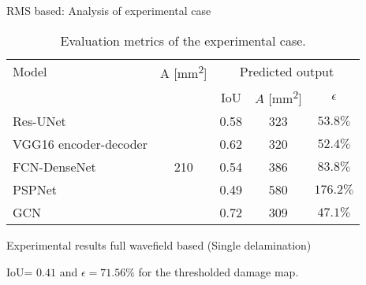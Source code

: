 \documentclass[10pt,aspectratio=169,dvipsnames]{beamer} %
\begin{document}
		\begin{frame}{RMS based: Analysis of experimental case}
			\begin{table}[!ht]
				\centering
				\caption{Evaluation metrics of the experimental case.}
				\label{tab:rms_exp_case}
				\begin{tabular}{l@{\ }cccc}
					\toprule
					\multicolumn{1}{l}{Model} & \multicolumn{1}{c}{A [mm\textsuperscript{2}]} & \multicolumn{3}{c}{Predicted output} \\ 
					\cmidrule(lr){3-5} & & \multicolumn{1}{c}{IoU} & \multicolumn{1}{c}{\(\hat{A}\) [mm\textsuperscript{2}]} & \(\epsilon\) \\ \midrule
					Res-UNet & \multicolumn{1}{c}{\multirow{5}{*}{210}} & \multicolumn{1}{c}{0.58} & \multicolumn{1}{c}{323}  & \(53.8\%\) \\ 
					VGG16 encoder-decoder &  & \multicolumn{1}{c}{0.62} & \multicolumn{1}{c}{320} & \(52.4\%\) 
					\\ 
					FCN-DenseNet &  & \multicolumn{1}{c}{0.54} & \multicolumn{1}{c}{386} & \(83.8\%\) \\ 
					PSPNet &  & \multicolumn{1}{c}{0.49} & \multicolumn{1}{c}{580} & \(176.2\%\) 
					\\ 
					GCN &  & \multicolumn{1}{c}{0.72} & \multicolumn{1}{c}{309} & \(47.1\%\) 
					\\ 
					\bottomrule
				\end{tabular}		
			\end{table}
		\end{frame}
		\begin{frame}{Experimental results full wavefield based (Single delamination)}
			\begin{figure}
				\centering
				\quad
				\quad
				\quad
			\end{figure}
			IoU= $0.41$ and $\epsilon=71.56\%$  for the thresholded damage map.
		\end{frame}
\end{document}
